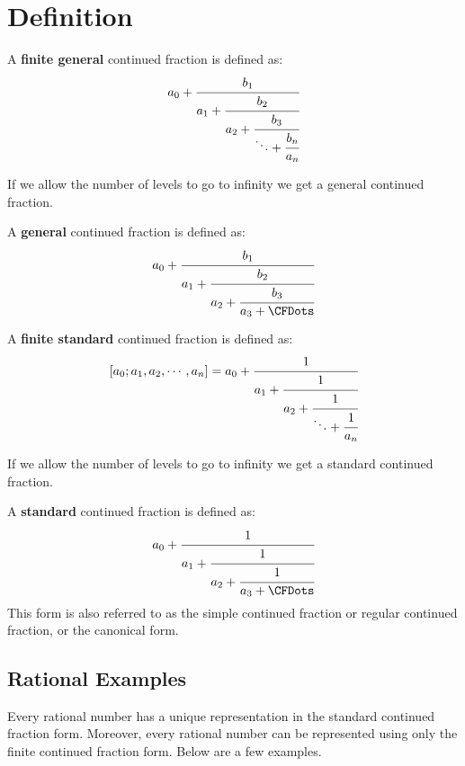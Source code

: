 \documentclass[a4paper]{article}
\begin{document}
    \section{Definition}\label{sec:definition}

    \begin{definition}
        \label{def_finite_gen_c_fract}
        A \textbf{finite general} continued fraction is defined as:
        \[
            a_0 +
            \cfrac{b_1}{a_1+\cfrac{b_2}{a_2 +\cfrac{b_3}{\ddots + \cfrac{b_n}{a_n} }}}
        \]
    \end{definition}

    If we allow the number of levels to go to infinity we get a general continued fraction.

    \begin{definition}
        \label{def_gen_c_fract}
        A \textbf{general} continued fraction is defined as:
        \[
            a_0 +
            \cfrac{b_1}{a_1+\cfrac{b_2}{a_2 +\cfrac{b_3}{a_3 + \CFDots}}}
        \]
    \end{definition}

    \begin{definition}
        \label{def_finite_c_fract}
        A \textbf{finite standard} continued fraction is defined as:
        \[
            [a_0;a_1, a_2, \cdots, a_n] = a_0 +
            \cfrac{1}{a_1+\cfrac{1}{a_2 +\cfrac{1}{\ddots + \cfrac{1}{a_n}}}}
        \]
    \end{definition}

    If we allow the number of levels to go to infinity we get a standard continued fraction.

    \begin{definition}
        \label{def_c_fract}
        A \textbf{standard} continued fraction is defined as:
        \[
            a_0 +
            \cfrac{1}{a_1+\cfrac{1}{a_2 +\cfrac{1}{a_3 + \CFDots}}}
        \]
        This form is also referred to as the simple continued fraction or regular continued fraction, or the canonical form.
    \end{definition}

    \subsection{Rational Examples}\label{subsec:rational-examples}
    Every rational number has a unique representation in the standard continued fraction form.
    Moreover, every rational number can be represented using only the finite continued fraction form.
    Below are a few examples.
\end{document}
